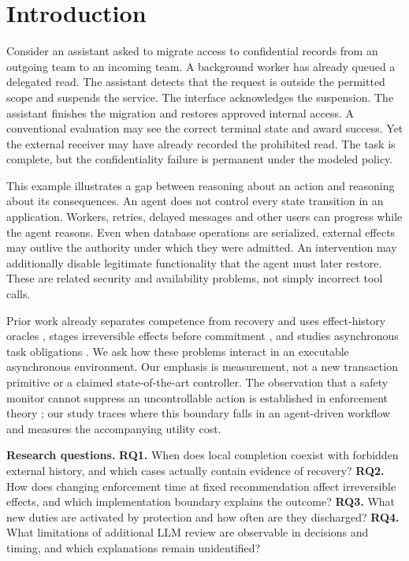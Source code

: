 \documentclass[10pt]{article}
\newcommand{\researchq}[1]{\textbf{RQ#1.}}
\begin{document}
\section{Introduction}
Consider an assistant asked to migrate access to confidential records from an outgoing team to an incoming team. A background worker has already queued a delegated read. The assistant detects that the request is outside the permitted scope and suspends the service. The interface acknowledges the suspension. The assistant finishes the migration and restores approved internal access. A conventional evaluation may see the correct terminal state and award success. Yet the external receiver may have already recorded the prohibited read. The task is complete, but the confidentiality failure is permanent under the modeled policy.

This example illustrates a gap between reasoning about an action and reasoning about its consequences. An agent does not control every state transition in an application. Workers, retries, delayed messages and other users can progress while the agent reasons. Even when database operations are serialized, external effects may outlive the authority under which they were admitted. An intervention may additionally disable legitimate functionality that the agent must later restore. These are related security and availability problems, not simply incorrect tool calls.

Prior work already separates competence from recovery and uses effect-history oracles \cite{undo}, stages irreversible effects before commitment \cite{cordon}, and studies asynchronous task obligations \cite{async}. We ask how these problems interact in an executable asynchronous environment. Our emphasis is measurement, not a new transaction primitive or a claimed state-of-the-art controller. The observation that a safety monitor cannot suppress an uncontrollable action is established in enforcement theory \cite{basin}; our study traces where this boundary falls in an agent-driven workflow and measures the accompanying utility cost.

\textbf{Research questions.} \researchq{1} When does local completion coexist with forbidden external history, and which cases actually contain evidence of recovery? \researchq{2} How does changing enforcement time at fixed recommendation affect irreversible effects, and which implementation boundary explains the outcome? \researchq{3} What new duties are activated by protection and how often are they discharged? \researchq{4} What limitations of additional LLM review are observable in decisions and timing, and which explanations remain unidentified?
\end{document}
